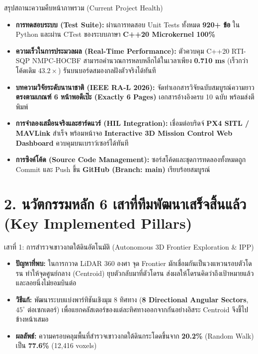 \documentclass[10pt,a4paper]{article}
\begin{document}
\vspace{4pt}
\begin{statbox}{สรุปสถานะความคืบหน้าภาพรวม (Current Project Health)}
\begin{itemize}[leftmargin=18pt, itemsep=3pt]
  \item \textbf{การทดสอบระบบ (Test Suite):} ผ่านการทดสอบ Unit Tests ทั้งหมด \textbf{920+ ข้อ} ใน Python และผ่าน CTest ของระบบภาษา \textbf{C++20 Microkernel 100\%}
  \item \textbf{ความเร็วในการประมวลผล (Real-Time Performance):} ตัวควบคุม C++20 RTI-SQP NMPC-HOCBF สามารถคำนวณการหลบหลีกได้ในเวลาเพียง \textbf{0.710 ms} (เร็วกว่าโค้ดเดิม $43.2\times$) รันบนบอร์ดสมองกลฝังตัวจริงได้ทันที
  \item \textbf{บทความวิจัยระดับนานาชาติ (IEEE RA-L 2026):} จัดทำเอกสารวิจัยฉบับสมบูรณ์ความยาว \textbf{ตรงตามเกณฑ์ 6 หน้าพอดีเป๊ะ (Exactly 6 Pages)} เอกสารอ้างอิงครบ 10 ฉบับ พร้อมส่งตีพิมพ์
  \item \textbf{การจำลองเสมือนจริงและฮาร์ดแวร์ (HIL Integration):} เชื่อมต่อบริดจ์ \textbf{PX4 SITL / MAVLink} สำเร็จ พร้อมหน้าจอ \textbf{Interactive 3D Mission Control Web Dashboard} ควบคุมบนเบราว์เซอร์ได้ทันที
  \item \textbf{การซิงค์โค้ด (Source Code Management):} ซอร์สโค้ดและชุดการทดลองทั้งหมดถูก Commit และ Push ขึ้น \textbf{GitHub (Branch: main)} เรียบร้อยสมบูรณ์
\end{itemize}
\end{statbox}

\vspace{6pt}

\section*{\textcolor{primary}{2. นวัตกรรมหลัก 6 เสาที่ทีมพัฒนาเสร็จสิ้นแล้ว (Key Implemented Pillars)}}

\begin{infobox}[primary]{เสาที่ 1: การสำรวจเขาวงกตใต้ดินอัตโนมัติ (Autonomous 3D Frontier Exploration \& IPP)}
\begin{itemize}[leftmargin=14pt, itemsep=2pt]
  \item \textbf{ปัญหาที่พบ:} ในการกวาด LiDAR 360 องศา จุด Frontier มักเชื่อมกันเป็นวงแหวนรอบตัวโดรน ทำให้จุดศูนย์กลาง (Centroid) ยุบตัวกลับมาที่ตัวโดรน ส่งผลให้โดรนคิดว่าถึงเป้าหมายแล้วและลอยนิ่งไม่ยอมบินต่อ
  \item \textbf{วิธีแก้:} พัฒนาระบบแบ่งพาร์ทิชันเชิงมุม 8 ทิศทาง (\textbf{8 Directional Angular Sectors}, $45^\circ$ ต่อเซกเตอร์) เพื่อแยกคลัสเตอร์ของแต่ละทิศทางออกจากกันอย่างอิสระ Centroid จึงชี้ไปข้างหน้าเสมอ
  \item \textbf{ผลลัพธ์:} ความครอบคลุมพื้นที่สำรวจเขาวงกตใต้ดินกระโดดขึ้นจาก \textbf{20.2\%} (Random Walk) เป็น \textbf{77.6\%} (12,416 voxels)
\end{itemize}
\end{infobox}
\end{document}
